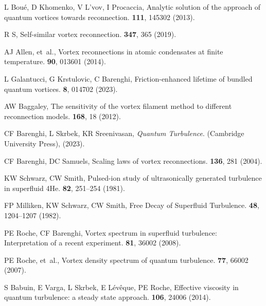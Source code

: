 \documentclass[9pt,twocolumn,twoside]{pnas-new}
\begin{document}
\begin{thebibliography}{10}
	L Bou\'{e}, D Khomenko, V L'vov, I Procaccia, Analytic solution of the approach of quantum vortices towards reconnection.
	 \textbf{111}, 145302 (2013).
	
	R S, Self-similar vortex reconnection.
	 \textbf{347}, 365 (2019).
	
	AJ Allen, et~al., Vortex reconnections in atomic condensates at finite temperature.
	 \textbf{90}, 013601 (2014).
	
	L Galantucci, G Krstulovic, C Barenghi, Friction-enhanced lifetime of bundled quantum vortices.
	 \textbf{8}, 014702 (2023).
	
	AW Baggaley, The sensitivity of the vortex filament method to different reconnection models.
	 \textbf{168}, 18 (2012).
	
	CF Barenghi, L Skrbek, KR Sreenivasan, {\em Quantum {{T}}urbulence}.
	\newblock (Cambridge University Press), (2023).
	
	CF Barenghi, DC Samuels, Scaling laws of vortex reconnections.
	 \textbf{136}, 281 (2004).
	
	KW Schwarz, CW Smith, Pulsed-ion study of ultrasonically generated turbulence in superfluid {{4He}}.
	 \textbf{82}, 251--254 (1981).
	
	FP Milliken, KW Schwarz, CW Smith, Free {{Decay}} of {{Superfluid Turbulence}}.
	 \textbf{48}, 1204--1207 (1982).
	
	PE Roche, CF Barenghi, Vortex spectrum in superfluid turbulence: {{Interpretation}} of a recent experiment.
	 \textbf{81}, 36002 (2008).
	
	PE Roche, et~al., Vortex density spectrum of quantum turbulence.
	 \textbf{77}, 66002 (2007).
	
	S Babuin, E Varga, L Skrbek, E L\'ev\^eque, PE Roche, Effective viscosity in quantum turbulence: a steady state approach.
	 \textbf{106}, 24006 (2014).
	

\end{thebibliography}
\end{document}
